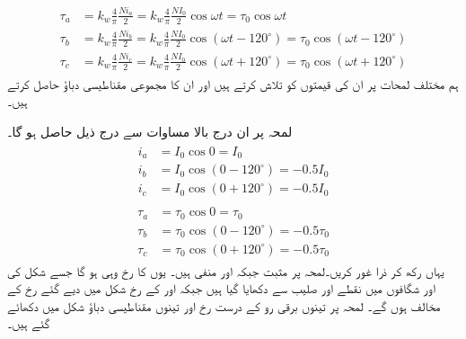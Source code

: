 %
\begin{gather}
\begin{aligned}\label{مساوات_گھومتے_مشین_تین_دور_دباو}
\tau_a&=k_w \frac{4}{\pi}\frac{N i_a}{2}=k_w \frac{4}{\pi}\frac{N I_0}{2} \cos \omega t=\tau_0 \cos \omega t\\
\tau_b&=k_w \frac{4}{\pi}\frac{N i_b}{2}=k_w \frac{4}{\pi}\frac{N I_0}{2} \cos (\omega t-120^{\circ})=\tau_0 \cos (\omega t-120^{\circ})\\
\tau_c&=k_w \frac{4}{\pi}\frac{N i_c}{2}=k_w \frac{4}{\pi}\frac{N I_0}{2} \cos (\omega t+120^{\circ})=\tau_0 \cos (\omega t+120^{\circ})
\end{aligned}
\end{gather}
 ہم مختلف لمحات پر ان کی قیمتوں کو  تلاش کرتے ہیں اور ان کا مجموعی مقناطیسی دباؤ حاصل کرتے ہیں۔

لمحہ  پر ان درج بالا مساوات سے درج ذیل حاصل ہو گا۔
\begin{gather}
\begin{aligned}
i_a&=I_0 \cos 0=I_0\\
i_b&=I_0 \cos (0-120^{\circ})=-0.5 I_0\\
i_c&=I_0 \cos (0+120^{\circ})=-0.5 I_0
\end{aligned}
\end{gather}
%
\begin{gather}
\begin{aligned}
\tau_a&=\tau_0 \cos 0=\tau_0\\
\tau_b&=\tau_0 \cos (0-120^{\circ})=-0.5 \tau_0\\
\tau_c&=\tau_0 \cos (0+120^{\circ})=-0.5 \tau_0
\end{aligned}
\end{gather}
یہاں رکھ کر ذرا غور کریں۔لمحہ   پر   مثبت  جبکہ  اور  منفی ہیں۔ یوں   کا رخ وہی  ہو گا جسے  شکل   کی   اور  شگافوں میں نقطے اور صلیب سے  دکھایا گیا ہیں جبکہ   اور  کے رخ شکل میں دیے گئے رخ کے مخالف ہوں گے۔ لمحہ  پر  تینوں برقی رو کے درست رخ اور  تینوں مقناطیسی دباؤ  شکل   میں دکھائے گئے ہیں۔
